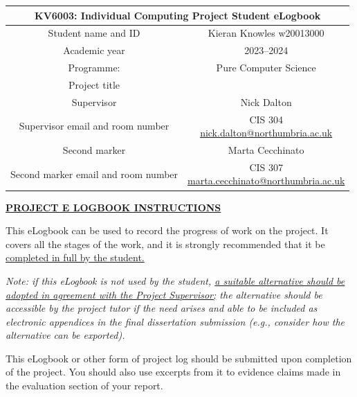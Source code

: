\documentclass[../CHEFCookingHelperForEveryonesFridge.tex]{subfiles}
\begin{document}
\raggedbottom

\begin{table}[h!]
    \centering
    \begin{tabular}{|c|c|}
        \hline
        \multicolumn{2}{|c|}{KV6003: Individual Computing Project Student eLogbook} \\\hline
        Student name and ID & Kieran Knowles w20013000 \\\hline
        Academic year & 2023--2024 \\\hline
        Programme: & Pure Computer Science \\\hline
        Project title & \chef{} \\\hline
        Supervisor & Nick Dalton \\\hline
        Supervisor email and room number & \makecell[c]{
            CIS 304 \\
            \href{mailto:nick.dalton@northumbria.ac.uk}{nick.dalton@northumbria.ac.uk}
        } \\\hline
        Second marker & Marta Cecchinato \\\hline
        Second marker email and room number & \makecell[c]{
            CIS 307 \\
            \href{mailto:marta.cecchinato@northumbria.ac.uk}{marta.cecchinato@northumbria.ac.uk}
        } \\\hline
    \end{tabular}
\end{table}

\textbf{\underline{PROJECT E LOGBOOK INSTRUCTIONS}}

This eLogbook can be used to record the progress of work on the project. It covers all the stages of the
work, and it is strongly recommended that it be \ul{completed in full by the student.}

\textit{
    Note: if this eLogbook is not used by the student, \ul{a suitable alternative should be adopted in agreement with
    the Project Supervisor;} the alternative should be accessible by the project tutor if the need arises and able
    to be included as electronic appendices in the final dissertation submission (e.g., consider how the alternative
    can be exported).
}

This eLogbook or other form of project log should be submitted upon completion of the project.
You should also use excerpts from it to evidence claims made in the evaluation section of your report.
\end{document}
